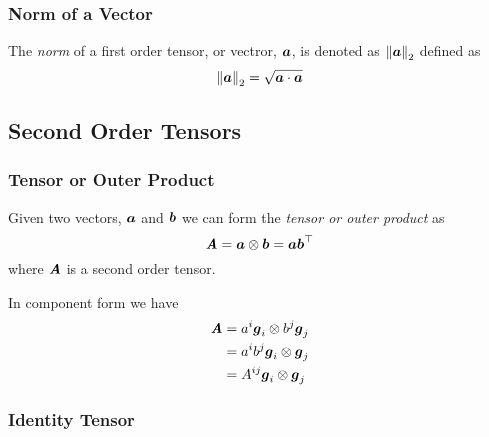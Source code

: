 \subsubsection{Norm of a Vector}
\label{subsubsec:NormTensorFirstOrder}

The \emph{norm} of a first order tensor, or vectror, $\boldsymbol{a}$, is denoted as
$ {\left\| \boldsymbol{a} \right\|_{2}} $ defined as
\begin{equation}
   {\ensuremath{\left\| \boldsymbol{a} \right\|}_{2}} =\sqrt{ \boldsymbol{a}  \cdot  \boldsymbol{a} }
\end{equation}

\subsection{Second Order Tensors}
\label{sec:TensorAlgebraSecondOrder}

\subsubsection{Tensor or Outer Product}
\label{subsubsec:TensorProductSecondOrder}

Given two vectors, $\boldsymbol{a}$ and $\boldsymbol{b}$ we can form the \emph{tensor or outer
product} as
\begin{equation}
  \boldsymbol{\mathit{A}}= \boldsymbol{a} \otimes \boldsymbol{b} =\boldsymbol{a} {\boldsymbol{b}}^{ \top } 
\end{equation}
where $\boldsymbol{\mathit{A}}$ is a second order tensor.

In component form we have
\begin{equation}
  \begin{aligned}
    \boldsymbol{\mathit{A}}&= a^{i}\boldsymbol{g}_{i} \otimes  b^{j}\boldsymbol{g}_{j} \\
    &=a^{i}b^{j} \boldsymbol{g}_{i} \otimes \boldsymbol{g}_{j} \\
    &=A^{ij} \boldsymbol{g}_{i} \otimes \boldsymbol{g}_{j} 
  \end{aligned}
\end{equation}

\subsubsection{Identity Tensor}
\label{subsubsec:IdentityTensorSecondOrder}

